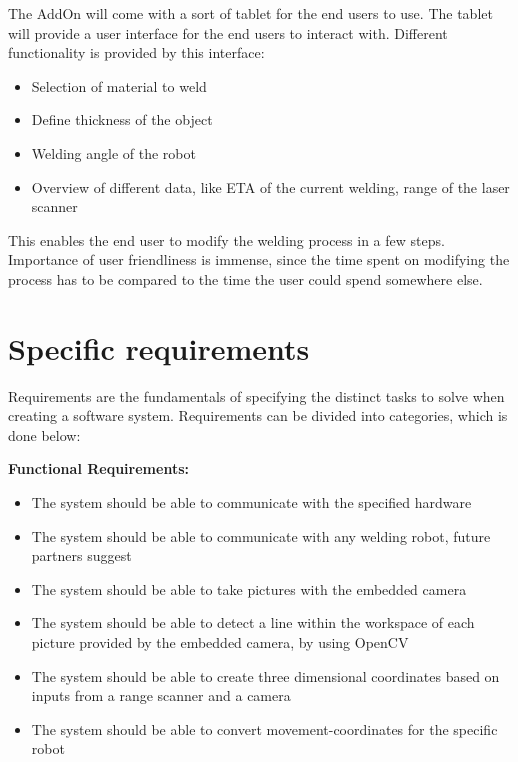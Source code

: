 \documentclass[12pt]{report} %
\begin{document}
The AddOn will come with a sort of tablet for the end users to use. The tablet will provide a user interface for the end users to interact with. Different functionality is provided by this interface: 

\begin{itemize}

\item Selection of material to weld 
\item Define thickness of the object
\item Welding angle of the robot
\item Overview of different data, like ETA of the current welding, range of the laser scanner

\end{itemize}

This enables the end user to modify the welding process in a few steps. Importance of user friendliness is immense, since the time spent on modifying the process has to be compared to the time the user could spend somewhere else.

\section{Specific requirements}
Requirements are the fundamentals of specifying the distinct tasks to solve when creating a software system. Requirements can be divided into categories, which is done below:

\textbf{Functional Requirements:}
\begin{itemize}

\item The system should be able to communicate with the specified hardware
\item The system should be able to communicate with any welding robot, future partners suggest
\item The system should be able to take pictures with the embedded camera 
\item The system should be able to detect a line within the workspace of each picture provided by the embedded camera, by using OpenCV
\item The system should be able to create three dimensional coordinates based on inputs from a range scanner and a camera
\item The system should be able to convert movement-coordinates for the specific robot

\end{itemize}
\end{document}
